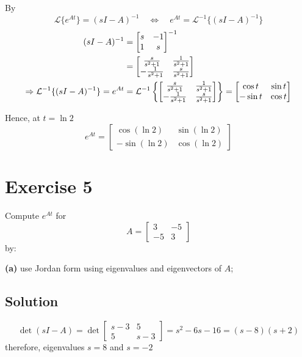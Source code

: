 \documentclass[12pt,a4paper]{article}
\begin{document}
By
\[
\mathcal L \{ e^{At}\} = (sI - A)^{-1} \quad \Leftrightarrow \quad e^{At} = \mathcal L^{-1} \{(sI - A)^{-1}\}
\]
\begin{align*}
	(sI - A)^{-1} &= \begin{bmatrix}
		s & -1 \\ 1 & s
	\end{bmatrix}^{-1} \\
	&=  \begin{bmatrix}
		{s\over s^2 + 1} & {1\over s^2 + 1} \\ -{1\over s^2 + 1} & {s\over s^2 + 1}
	\end{bmatrix} \\
	\Rightarrow \mathcal L^{-1} \{ (sI -A)^{-1}\} = e^{At} &= \mathcal L^{-1} \left\{ \begin{bmatrix}
		{s\over s^2 + 1} & {1\over s^2 + 1} \\ -{1\over s^2 + 1} & {s\over s^2 + 1}
	\end{bmatrix} \right\} = \begin{bmatrix}
	\cos t & \sin t \\ -\sin t & \cos t
	\end{bmatrix}
\end{align*}

Hence, at $t = \ln2$	
\[
e^{At} = \begin{bmatrix}
	\cos(\ln2) & \sin(\ln2) \\ -\sin(\ln2) & \cos(\ln2)
\end{bmatrix}
\]


\section*{Exercise 5}
Compute $e^{At}$ for
\[
A=\begin{bmatrix}3&-5\\-5&3\end{bmatrix}
\]
by:

\textbf{(a)} use Jordan form using eigenvalues and eigenvectors of $A$;
\subsection*{Solution}

\[
\det (sI - A) = \det \begin{bmatrix}
	s -3 & 5 \\ 5 & s - 3
\end{bmatrix} = s^2-6s-16 = (s-8)(s+2)
\]
therefore, eigenvalues $s=8$ and $s=-2$
\end{document}
